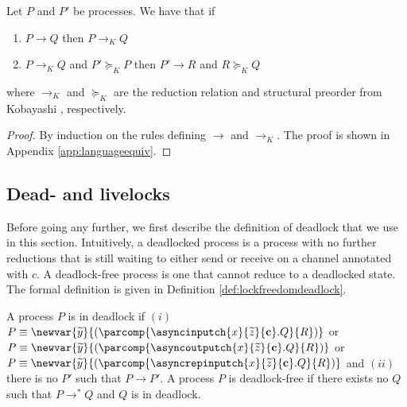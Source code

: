\begin{lemma}
Let $P$ and $P'$ be processes. We have that if
\begin{enumerate}
    \item $P \longrightarrow Q$ then $P \longrightarrow_{K} Q$
    \item $P \longrightarrow_{K} Q$ and $P' \succeq_K P$ then $P' \longrightarrow R$ and $R \succeq_{K} Q$
\end{enumerate}
where $\longrightarrow_{K}$ and $\succeq_{K}$ are the reduction relation and structural preorder from Kobayashi \cite{Kobayashi2000}, respectively.
\begin{proof} By induction on the rules defining $\longrightarrow$ and $\longrightarrow_{K}$. The proof is shown in Appendix \ref{app:languageequiv}.%
\end{proof}\label{lemma:langequiv}
\end{lemma}
%
\subsection{Dead- and livelocks}

Before going any further, we first describe the definition of deadlock that we use in this section. Intuitively, a deadlocked process is a process with no further reductions that is still waiting to either send or receive on a channel annotated with $c$. A deadlock-free process is one that cannot reduce to a deadlocked state. The formal definition is given in Definition \ref{def:lockfreedomdeadlock}.

%

\begin{defi}[Deadlock]
    A process $P$ is in deadlock if $(i)$ $P \equiv \newvar{\widetilde{y}}{(\parcomp{\asyncinputch{x}{\widetilde{z}}{\mathbf{c}}.Q}{R})}$ or $P \equiv \newvar{\widetilde{y}}{(\parcomp{\asyncoutputch{x}{\widetilde{z}}{\mathbf{c}}.Q}{R})}$ or $P \equiv \newvar{\widetilde{y}}{(\parcomp{\asyncrepinputch{x}{\widetilde{z}}{\mathbf{c}}.Q}{R})}$ and $(ii)$ there is no $P'$ such that $P \longrightarrow P'$. A process $P$ is deadlock-free if there exists no $Q$ such that $P \longrightarrow^* Q$ and $Q$ is in deadlock.
    \label{def:lockfreedomdeadlock}
\end{defi}

